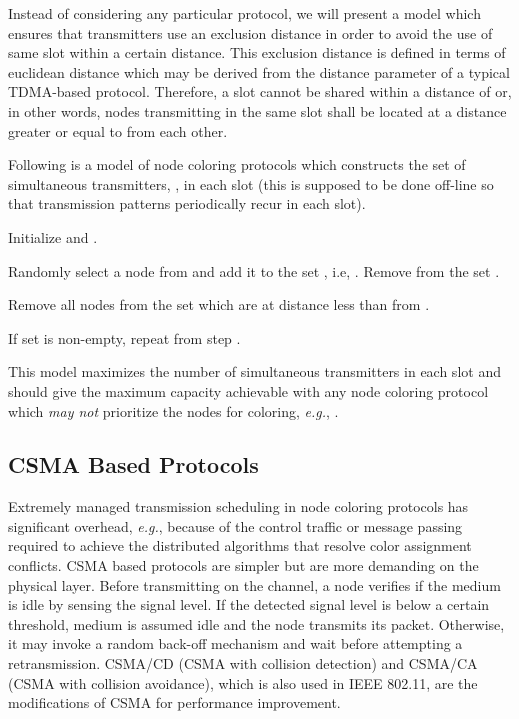 \documentclass[12pt,english]{article}
\begin{document}
Instead of considering any particular protocol, we will present a model which ensures that transmitters use an exclusion distance in order to avoid the use of same slot within a certain distance. This exclusion distance is defined in terms of euclidean distance  which may be derived from the distance parameter of a typical TDMA-based protocol. Therefore, a slot cannot be shared within a distance of  or, in other words, nodes transmitting in the same slot shall be located at a distance greater or equal to  from each other. 

Following is a model of node coloring protocols which constructs the set of simultaneous transmitters, , in each slot (this is supposed to be done off-line so that transmission patterns periodically recur in each slot).
\begin{compactenum}
\item Initialize  and .
\item Randomly select a node  from  and add it to the set , i.e, . Remove  from the set .
\item Remove all nodes from the set  which are at distance less than  from .
\item If set  is non-empty, repeat from step .
\end{compactenum}
This model maximizes the number of simultaneous transmitters in each slot and should give the maximum capacity achievable with any node coloring protocol which {\em may not} prioritize the nodes for coloring, {\it e.g.}, \cite{DRAND}.

\subsection{CSMA Based Protocols}
\label{sec:csma}

Extremely managed transmission scheduling in node coloring protocols has significant overhead, {\it e.g.}, because of the control traffic or message passing required to achieve the distributed algorithms that resolve color assignment conflicts. CSMA based protocols are simpler but are more demanding on the physical layer. Before transmitting on the channel, a node verifies if the medium is idle by sensing the signal level. If the detected signal level is below a certain threshold, medium is assumed idle and the node transmits its packet. Otherwise, it may invoke a random back-off mechanism and wait before attempting a retransmission. CSMA/CD (CSMA with collision detection) and CSMA/CA (CSMA with collision avoidance), which is also used in IEEE 802.11, are the modifications of CSMA for performance improvement. 
\end{document}
